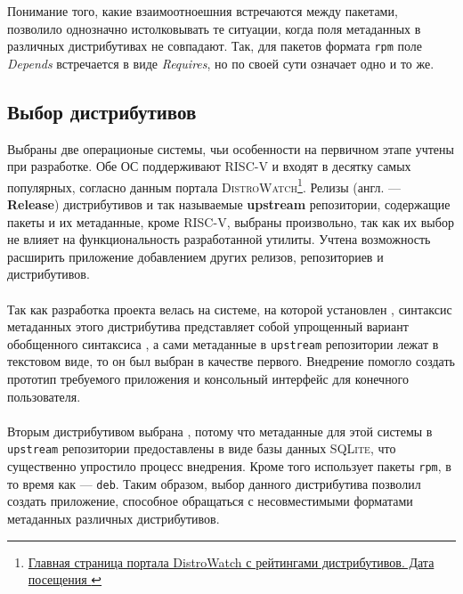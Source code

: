 Понимание того, какие взаимоотноешния встречаются между пакетами, позволило однозначно истолковывать те ситуации, когда поля метаданных в различных дистрибутивах не совпадают.
Так, для пакетов формата \texttt{rpm} поле \textit{Depends} встречается в виде \textit{Requires}, но по своей сути означает одно и то же.

\subsection{Выбор дистрибутивов}
Выбраны две операционые системы, чьи особенности на первичном этапе учтены при разработке.
Обе ОС поддерживают \textsc{RISC-V} и входят в десятку самых популярных, согласно данным портала \textsc{DistroWatch}\footnote{\href{https://distrowatch.com/}{Главная страница портала DistroWatch с рейтингами дистрибутивов. Дата посещения }}.
Релизы (англ. --- \textbf{Release}) дистрибутивов и так называемые \textbf{upstream} репозитории, содержащие пакеты и их метаданные, кроме \textsc{RISC-V}, выбраны произвольно, так как их выбор не влияет на функциональность разработанной утилиты.
Учтена возможность расширить приложение добавлением других релизов, репозиториев и дистрибутивов.

\paragraph{\ubuntu}
Так как разработка проекта велась на системе, на которой установлен {\ubuntu}, синтаксис метаданных этого дистрибутива представляет собой упрощенный вариант обобщенного синтаксиса {\debian}, а сами метаданные в \texttt{upstream} репозитории лежат в текстовом виде, то он был выбран в качестве первого.
Внедрение {\ubuntu} помогло создать прототип требуемого приложения и консольный интерфейс для конечного пользователя.

\paragraph{\fedora}
Вторым дистрибутивом выбрана {\fedora}, потому что метаданные для этой системы в \texttt{upstream} репозитории предоставлены в виде базы данных \textsc{SQLite}, что существенно упростило процесс внедрения.
Кроме того {\fedora} использует пакеты \texttt{rpm}, в то время как {\ubuntu} --- \texttt{deb}. Таким образом, выбор данного дистрибутива позволил создать приложение, способное обращаться с несовместимыми форматами метаданных различных дистрибутивов.

